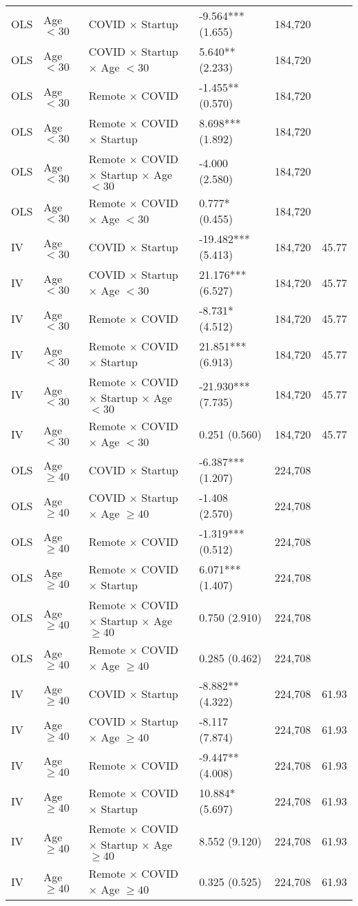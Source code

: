 \documentclass[11pt]{article}
\begin{document}
{\begin{longtable}{llllrr}
OLS & Age $< 30$ & COVID $\times$ Startup & -9.564*** (1.655) & 184,720 &  \\
OLS & Age $< 30$ & COVID $\times$ Startup × Age $< 30$ &  5.640** (2.233) & 184,720 &  \\
OLS & Age $< 30$ & Remote $\times$ COVID & -1.455** (0.570) & 184,720 &  \\
OLS & Age $< 30$ & Remote $\times$ COVID $\times$ Startup &  8.698*** (1.892) & 184,720 &  \\
OLS & Age $< 30$ & Remote $\times$ COVID $\times$ Startup × Age $< 30$ & -4.000 (2.580) & 184,720 &  \\
OLS & Age $< 30$ & Remote $\times$ COVID × Age $< 30$ &  0.777* (0.455) & 184,720 &  \\
IV & Age $< 30$ & COVID $\times$ Startup & -19.482*** (5.413) & 184,720 & 45.77 \\
IV & Age $< 30$ & COVID $\times$ Startup × Age $< 30$ &  21.176*** (6.527) & 184,720 & 45.77 \\
IV & Age $< 30$ & Remote $\times$ COVID & -8.731* (4.512) & 184,720 & 45.77 \\
IV & Age $< 30$ & Remote $\times$ COVID $\times$ Startup &  21.851*** (6.913) & 184,720 & 45.77 \\
IV & Age $< 30$ & Remote $\times$ COVID $\times$ Startup × Age $< 30$ & -21.930*** (7.735) & 184,720 & 45.77 \\
IV & Age $< 30$ & Remote $\times$ COVID × Age $< 30$ &  0.251 (0.560) & 184,720 & 45.77 \\
OLS & Age $\ge 40$ & COVID $\times$ Startup & -6.387*** (1.207) & 224,708 &  \\
OLS & Age $\ge 40$ & COVID $\times$ Startup × Age $\ge 40$ & -1.408 (2.570) & 224,708 &  \\
OLS & Age $\ge 40$ & Remote $\times$ COVID & -1.319*** (0.512) & 224,708 &  \\
OLS & Age $\ge 40$ & Remote $\times$ COVID $\times$ Startup &  6.071*** (1.407) & 224,708 &  \\
OLS & Age $\ge 40$ & Remote $\times$ COVID $\times$ Startup × Age $\ge 40$ &  0.750 (2.910) & 224,708 &  \\
OLS & Age $\ge 40$ & Remote $\times$ COVID × Age $\ge 40$ &  0.285 (0.462) & 224,708 &  \\
IV & Age $\ge 40$ & COVID $\times$ Startup & -8.882** (4.322) & 224,708 & 61.93 \\
IV & Age $\ge 40$ & COVID $\times$ Startup × Age $\ge 40$ & -8.117 (7.874) & 224,708 & 61.93 \\
IV & Age $\ge 40$ & Remote $\times$ COVID & -9.447** (4.008) & 224,708 & 61.93 \\
IV & Age $\ge 40$ & Remote $\times$ COVID $\times$ Startup &  10.884* (5.697) & 224,708 & 61.93 \\
IV & Age $\ge 40$ & Remote $\times$ COVID $\times$ Startup × Age $\ge 40$ &  8.552 (9.120) & 224,708 & 61.93 \\
IV & Age $\ge 40$ & Remote $\times$ COVID × Age $\ge 40$ &  0.325 (0.525) & 224,708 & 61.93 \\
\end{longtable}

}
\end{document}
